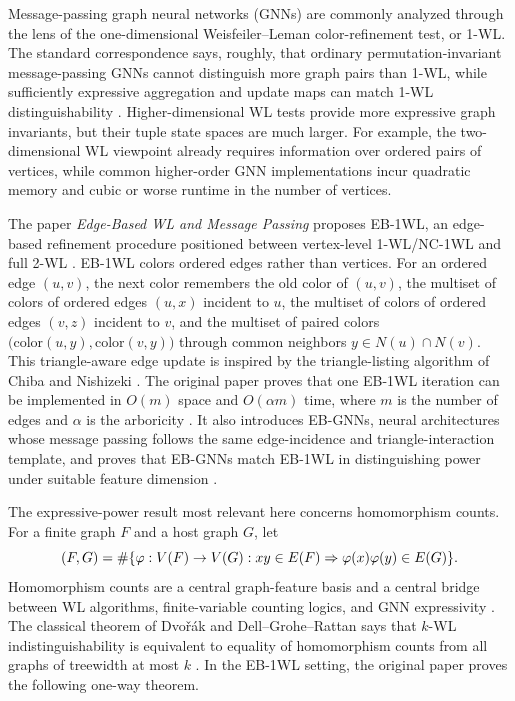 \documentclass[11pt]{article}
\let\hom\relax
\DeclareMathOperator{\hom}{hom}
\begin{document}
Message-passing graph neural networks (GNNs) are commonly analyzed through the lens of the one-dimensional Weisfeiler--Leman color-refinement test, or 1-WL.  The standard correspondence says, roughly, that ordinary permutation-invariant message-passing GNNs cannot distinguish more graph pairs than 1-WL, while sufficiently expressive aggregation and update maps can match 1-WL distinguishability \cite{Xu2019,Morris2019}.  Higher-dimensional WL tests provide more expressive graph invariants, but their tuple state spaces are much larger.  For example, the two-dimensional WL viewpoint already requires information over ordered pairs of vertices, while common higher-order GNN implementations incur quadratic memory and cubic or worse runtime in the number of vertices.

The paper \emph{Edge-Based WL and Message Passing} proposes EB-1WL, an edge-based refinement procedure positioned between vertex-level 1-WL/NC-1WL and full 2-WL \cite{EBWL}.  EB-1WL colors ordered edges rather than vertices.  For an ordered edge $(u,v)$, the next color remembers the old color of $(u,v)$, the multiset of colors of ordered edges $(u,x)$ incident to $u$, the multiset of colors of ordered edges $(v,z)$ incident to $v$, and the multiset of paired colors $\bigl(\mathrm{color}(u,y),\mathrm{color}(v,y)\bigr)$ through common neighbors $y\in N(u)\cap N(v)$.  This triangle-aware edge update is inspired by the triangle-listing algorithm of Chiba and Nishizeki \cite{ChibaNishizeki1985}.  The original paper proves that one EB-1WL iteration can be implemented in $O(m)$ space and $O(\alpha m)$ time, where $m$ is the number of edges and $\alpha$ is the arboricity \cite{EBWL}.  It also introduces EB-GNNs, neural architectures whose message passing follows the same edge-incidence and triangle-interaction template, and proves that EB-GNNs match EB-1WL in distinguishing power under suitable feature dimension \cite{EBWL}.

The expressive-power result most relevant here concerns homomorphism counts.  For a finite graph $F$ and a host graph $G$, let
\[
\hom(F,G)=\#\{\varphi:V(F)\to V(G): xy\in E(F)\Rightarrow \varphi(x)\varphi(y)\in E(G)\}.
\]
Homomorphism counts are a central graph-feature basis and a central bridge between WL algorithms, finite-variable counting logics, and GNN expressivity \cite{Lovasz1967,Dvorak2010,DellGroheRattan2018,Barcelo2021}.  The classical theorem of Dvo\v{r}\'ak and Dell--Grohe--Rattan says that $k$-WL indistinguishability is equivalent to equality of homomorphism counts from all graphs of treewidth at most $k$ \cite{Dvorak2010,DellGroheRattan2018}.  In the EB-1WL setting, the original paper proves the following one-way theorem.
\end{document}
